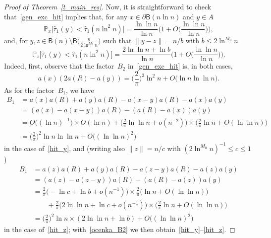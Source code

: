 \documentclass[10pt]{amsart}
\theoremstyle{definition}\newtheorem{defi}[theo]{Definition}\newtheorem{rema}[theo]{Remark}\newtheorem{exam}[theo]{Example}\newtheorem{exem}[theo]{Example}\newtheorem{nota}[theo]{Notation}
\newcommand{\1}[1]{{\mathbf 1}{\{#1\}}}
\newcommand{\8}{{\infty}}
\newcommand{\IP}{{\mathbb P}}
\newcommand{\htau}{\widehat{\tau}}
\newcommand{\B}{{\mathsf B}}
\begin{document}
\begin{proof}[Proof of Theorem~\ref{t_main_res}]
Now, it is straightforward to check that~\eqref{gen_exc_hit} implies that, for any $x\in \partial\B(n\ln n)$ and $y \in A$
\begin{equation}\label{hit_y}
\IP_x\big[\htau_1(y)<\htau_1(n\ln^2 n)\big] = \frac{\ln\ln n}{\ln n}
\Big(1+O\Big(\frac{\ln\ln n}{\ln n}\Big)\Big),
\end{equation}
and, for $y,z\in \B(n)\setminus\B\big(\frac{n}{2\ln^{M_0}n}\big)$ such that $\|y-z\| = n/b$ with $b\leq 2\ln^{M_0}n$
\begin{equation}\label{hit_z}
\IP_z\big[\htau_1(y)<\htau_1(n\ln^2 n)\big] =
\frac{2\ln\ln n + \ln b}{\ln n}
\Big(1+O\Big(\frac{\ln\ln n}{\ln n}\Big)\Big).
\end{equation}
Indeed, first, observe that the factor~$B_2$ in~\eqref{gen_exc_hit} is, in both cases,
\begin{equation}\label{ocenka_B2}
a(x)(2a(R)-a(y)) = \Big(\frac{2}{\pi}\Big)^2
\ln^2 n + O\big(\ln n\ln\ln n\big).
\end{equation}
As for the factor~$B_1$, we have
\begin{align*}
B_1 &= a(x)a(R)+a(y)a(R)-a(x-y)a(R)-a(x)a(y)\\
&= (a(x)-a(x-y))a(R) - (a(R)-a(x))a(y)\\
&= O\big((\ln n)^{-1}\big)\times O(\ln n) + \Big(\frac{2}{\pi}\ln\ln n + o(n^{-2})\Big)
\times \Big(\frac{2}{\pi}\ln n + O(\ln\ln n)\Big)\\
&= \Big(\frac{2}{\pi}\Big)^2
\ln n\ln\ln n + O\big((\ln\ln n)^2\big)
\end{align*}
in the case of~\eqref{hit_y}, and (writing also $\|z\|=n/c$ with $(2\ln^{M_0} n)^{-1}\leq c\leq 1$)
\begin{align*}
B_1 &= a(z)a(R)+a(y)a(R)-a(z-y)a(R)-a(z)a(y)\\
&= (a(z)-a(z-y))a(R) - (a(R)-a(z))a(y)\\
&= \frac{2}{\pi}\big(-\ln c +\ln b + o(n^{-1})\big)
\times \frac{2}{\pi}\big(\ln n + O(\ln\ln n)\big)\\
& \qquad + \frac{2}{\pi}\big(2\ln\ln n +\ln c + o(n^{-1})\big)
\times \Big(\frac{2}{\pi}\ln n + O(\ln\ln n)\Big)\\
&= \Big(\frac{2}{\pi}\Big)^2
\ln n\times(2\ln\ln n + \ln b) + O\big((\ln\ln n)^2\big)
\end{align*}
in the case of~\eqref{hit_z}; with~\eqref{ocenka_B2} we then obtain~\eqref{hit_y}--\eqref{hit_z}.


\end{proof}
\end{document}
